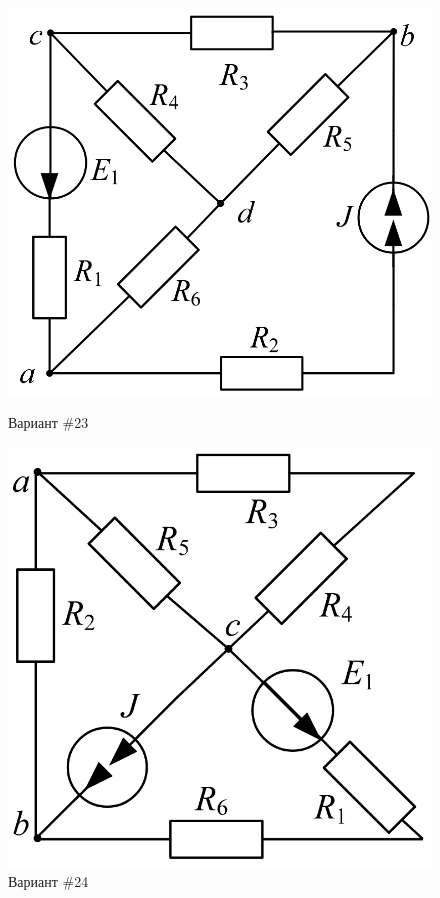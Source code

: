 \begin{figure}[H]
    \centering
    \begin{minipage}{0.48\textwidth}
        \centering
        \includegraphics[width=\textwidth]{images/23_task.png}
        \caption{Вариант \#23}
        \label{fig:task_23}
    \end{minipage}
    \hfill
    \begin{minipage}{0.48\textwidth}
        \centering
        \includegraphics[width=\textwidth]{images/24_task.png}
        \caption{Вариант \#24}
        \label{fig:task_24}
    \end{minipage}
\end{figure}

